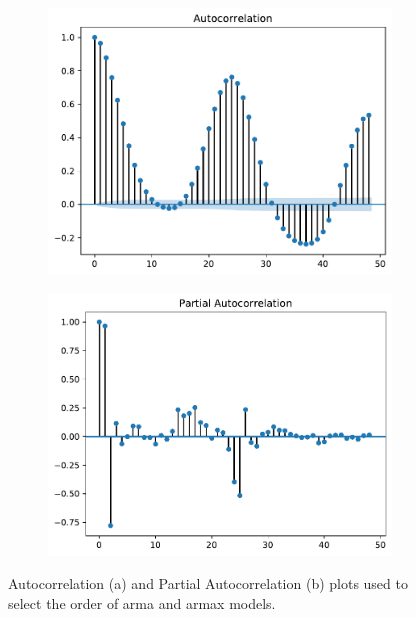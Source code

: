 \begin{figure}[h!]%
	\centering
	\begin{subfigure}{.5\textwidth}
		\centering
		\includegraphics[width=\textwidth]{plots/ACF/load_48lags_ndiff0_hstep1}%
		\caption{}
		\label{fig:acf_load_lags42}%
	\end{subfigure}%
	\begin{subfigure}{.5\textwidth}
		\centering
		\includegraphics[width=\textwidth]{plots/PACF/load_48lags_ndiff0_hstep1}%
		\caption{}
		\label{fig:pacf_load_lags42}%
	\end{subfigure}
	\caption{Autocorrelation (a) and Partial Autocorrelation (b) plots used to select the order of \acrshort{arma} and \acrshort{armax} models.}
	\label{fig:acf_compare}
\end{figure}

